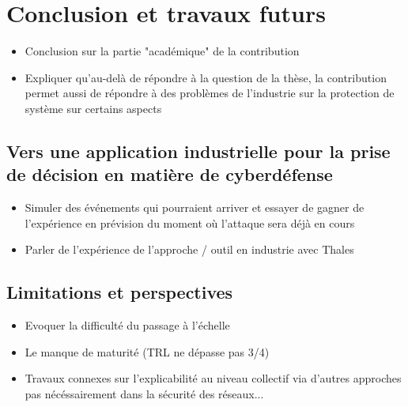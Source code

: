 \chapter{Conclusion et travaux futurs}\label{ch:conclusion} %

\begin{itemize}
    \item Conclusion sur la partie "académique" de la contribution
    \item Expliquer qu'au-delà de répondre à la question de la thèse, la contribution permet aussi de répondre à des problèmes de l'industrie sur la protection de système sur certains aspects
\end{itemize}

\section{Vers une application industrielle pour la prise de décision en matière de cyberdéfense}
\begin{itemize}
    \item Simuler des événements qui pourraient arriver et essayer de gagner de l'expérience en prévision du moment où l'attaque sera déjà en cours
    \item Parler de l'expérience de l'approche / outil en industrie avec Thales
\end{itemize}

\section{Limitations et perspectives}
\begin{itemize}
    \item Evoquer la difficulté du passage à l'échelle
    \item Le manque de maturité (TRL ne dépasse pas 3/4)
    \item Travaux connexes sur l'explicabilité au niveau collectif via d'autres approches pas nécéssairement dans la sécurité des réseaux...
\end{itemize}
